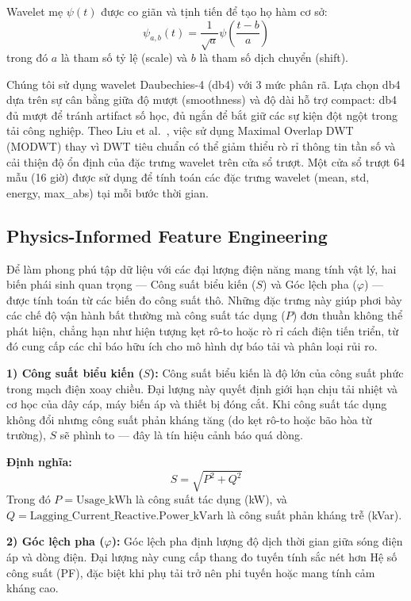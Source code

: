 Wavelet mẹ $\psi(t)$ được co giãn và tịnh tiến để tạo họ hàm cơ sở:
\begin{equation}
\psi_{a,b}(t) = \frac{1}{\sqrt{a}}\psi\left(\frac{t-b}{a}\right)
\label{eq:wavelet_basis}
\end{equation}
trong đó $a$ là tham số tỷ lệ (scale) và $b$ là tham số dịch chuyển (shift).

Chúng tôi sử dụng wavelet Daubechies-4 (db4) với 3 mức phân rã.
Lựa chọn db4 dựa trên sự cân bằng giữa độ mượt (smoothness) và độ dài hỗ trợ compact:
db4 đủ mượt để tránh artifact số học, đủ ngắn để bắt giữ các sự kiện đột ngột trong tải công nghiệp.
Theo Liu et al.~\cite{liu2022modwt}, việc sử dụng Maximal Overlap DWT (MODWT)
thay vì DWT tiêu chuẩn có thể giảm thiểu rò rỉ thông tin tần số
và cải thiện độ ổn định của đặc trưng wavelet trên cửa sổ trượt.
Một cửa sổ trượt 64 mẫu (16 giờ) được sử dụng để tính toán
các đặc trưng wavelet (mean, std, energy, max\_abs) tại mỗi bước thời gian.

\subsection{Physics-Informed Feature Engineering}

Để làm phong phú tập dữ liệu với các đại lượng điện năng mang tính vật lý,
hai biến phái sinh quan trọng --- Công suất biểu kiến ($S$) và Góc lệch pha
($\varphi$) --- được tính toán từ các biến đo công suất thô.
Những đặc trưng này giúp phơi bày các chế độ vận hành bất thường mà công suất tác dụng ($P$) đơn thuần không thể phát hiện,
chẳng hạn như hiện tượng kẹt rô-to hoặc rò rỉ cách điện tiến triển,
từ đó cung cấp các chỉ báo hữu ích cho mô hình dự báo tải và phân loại rủi ro.

\textbf{1) Công suất biểu kiến ($S$):}
Công suất biểu kiến là độ lớn của công suất phức trong mạch điện xoay chiều.
Đại lượng này quyết định giới hạn chịu tải nhiệt và cơ học của dây cáp, máy biến áp và thiết bị đóng cắt.
Khi công suất tác dụng không đổi nhưng công suất phản kháng tăng (do kẹt rô-to hoặc bão hòa từ trường),
$S$ sẽ phình to --- đây là tín hiệu cảnh báo quá dòng.

\textbf{Định nghĩa:}
\begin{equation}
S = \sqrt{P^2 + Q^2}
\label{eq:apparent}
\end{equation}
Trong đó $P = \text{Usage\_kWh}$ là công suất tác dụng (kW),
và $Q = \text{Lagging\_Current\_Reactive.Power\_kVarh}$ là công suất phản kháng trễ (kVar).

\textbf{2) Góc lệch pha ($\varphi$):}
Góc lệch pha định lượng độ dịch thời gian giữa sóng điện áp và dòng điện.
Đại lượng này cung cấp thang đo tuyến tính sắc nét hơn Hệ số công suất (PF),
đặc biệt khi phụ tải trở nên phi tuyến hoặc mang tính cảm kháng cao.

